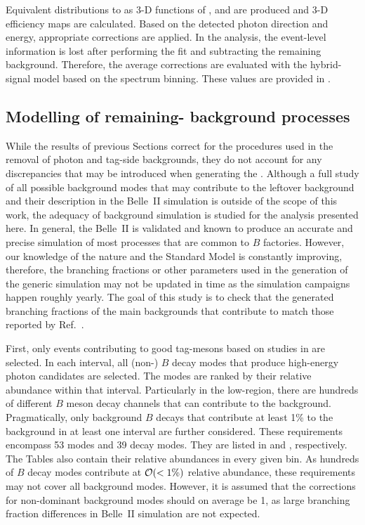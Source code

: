 Equivalent distributions to  as 3-D functions of \pRecoil, \pRecoilPhi and \pRecoilTheta are produced and 3-D efficiency maps are calculated.
Based on the detected photon direction and energy, appropriate corrections are applied.
In the \BtoXsgamma analysis, the event-level information is lost after performing the \Mbc fit and subtracting the remaining \BB background.
Therefore, the average corrections are evaluated with the \BtoXsgamma hybrid-signal model based on the \EB spectrum binning.
These values are provided in .

\subsection{Modelling of remaining-\texorpdfstring{\BB}{BB} background processes}\label{sec:remaining_bb_background_modelling}

While the results of previous Sections correct for the procedures used in the removal of photon and tag-side backgrounds, they do not account for any discrepancies that may be introduced when generating the \MC.
Although a full study of all possible background modes that may contribute to the leftover \BB background and their description in the Belle~II simulation is outside of the scope of this work, 
the adequacy of background simulation is studied for the analysis presented here.
In general, the Belle~II \MC is validated and known to produce an accurate and precise simulation of most processes that are common to $B$ factories.
However, our knowledge of the nature and the Standard Model is constantly improving, therefore, the branching fractions or other parameters used in the generation of the generic \BB simulation may not be updated in time as the simulation campaigns happen roughly yearly.
The goal of this study is to check that the generated branching fractions of the main backgrounds that contribute to \BtoXsgamma match those reported by Ref.~\cite{Workman:2022ynf}.

First, only events contributing to good tag-\B mesons based on studies in  are selected.
In each \EB interval, all (non-\BtoXsgamma) $B$ decay modes that produce high-energy photon candidates are selected.
The modes are ranked by their relative abundance within that \EB interval.
Particularly in the low-\EB region, there are hundreds of different $B$ meson decay channels that can contribute to the background.
Pragmatically, only background $B$ decays that contribute at least 1\% to the background in at least one \EB interval are further considered.
These requirements encompass 53 \Bp modes and 39 \Bz decay modes. 
They are listed in  and , respectively.
The Tables also contain their relative abundances in every given bin.
As hundreds of $B$ decay modes contribute at ${\cal O}(<1\%)$ relative abundance, these requirements may not cover all background modes. 
However, it is assumed that the corrections for non-dominant background modes should on average be 1, as large branching fraction differences in Belle~II simulation are not expected.

